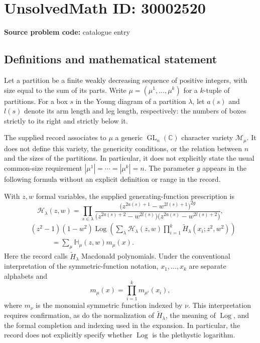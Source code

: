 \documentclass[11pt]{article}
\newcommand{\C}{\mathbb{C}}
\begin{document}
\section*{UnsolvedMath ID: 30002520}
\textbf{Source problem code:} catalogue entry
\subsection{Definitions and mathematical statement}
Let a partition be a finite weakly decreasing sequence of positive integers, with size equal to the sum of its parts. Write \(\mu=(\mu^1,\ldots,\mu^k)\) for a \(k\)-tuple of partitions. For a box \(s\) in the Young diagram of a partition \(\lambda\), let \(a(s)\) and \(l(s)\) denote its arm length and leg length, respectively: the numbers of boxes strictly to its right and strictly below it.

The supplied record associates to \(\mu\) a generic \(\operatorname{GL}_n(\C)\) character variety \(\mathcal M_\mu\). It does not define this variety, the genericity conditions, or the relation between \(n\) and the sizes of the partitions. In particular, it does not explicitly state the usual common-size requirement \(|\mu^1|=\cdots=|\mu^k|=n\). The parameter \(g\) appears in the following formula without an explicit definition or range in the record.

With \(z,w\) formal variables, the supplied generating-function prescription is
\[
\mathcal H_\lambda(z,w)
=\prod_{s\in\lambda}
\frac{\bigl(z^{2a(s)+1}-w^{2l(s)+1}\bigr)^{2g}}
{\bigl(z^{2a(s)+2}-w^{2l(s)}\bigr)
 \bigl(z^{2a(s)}-w^{2l(s)+2}\bigr)},
\]
\[
\begin{aligned}
&(z^2-1)(1-w^2)\operatorname{Log}\!\left(
\sum_\lambda \mathcal H_\lambda(z,w)
\prod_{i=1}^k\widetilde H_\lambda(x_i;z^2,w^2)
\right)\\
&\hspace{3em}=\sum_\mu\mathbb H_\mu(z,w)m_\mu(x).
\end{aligned}
\]
Here the record calls \(\widetilde H_\lambda\) Macdonald polynomials. Under the conventional interpretation of the symmetric-function notation, \(x_1,\ldots,x_k\) are separate alphabets and
\[
m_\mu(x)=\prod_{i=1}^k m_{\mu^i}(x_i),
\]
where \(m_\nu\) is the monomial symmetric function indexed by \(\nu\). This interpretation requires confirmation, as do the normalization of \(\widetilde H_\lambda\), the meaning of \(\operatorname{Log}\), and the formal completion and indexing used in the expansion. In particular, the record does not explicitly specify whether \(\operatorname{Log}\) is the plethystic logarithm.
\end{document}
